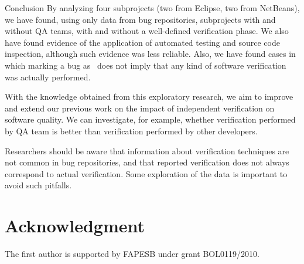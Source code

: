 \begin{section}{Conclusion} \label{sec:conclusion}
	By analyzing four subprojects (two from Eclipse, two from NetBeans), we have found, using only data from bug repositories, subprojects with and without QA teams, with and without a well-defined verification phase. We also have found evidence of the application of automated testing and source code inspection, although such evidence was less reliable. Also, we have found cases in which marking a bug as \VERIFIED\ does not imply that any kind of software verification was actually performed.
			
	With the knowledge obtained from this exploratory research, we aim to improve and extend our previous work on the impact of independent verification on software quality. We can investigate, for example, whether verification performed by QA team is better than verification performed by other developers.
	
	Researchers should be aware that information about verification techniques are not common in bug repositories, and that reported verification does not always correspond to actual verification. Some exploration of the data is important to avoid such pitfalls.
	
	
\end{section}

\section*{Acknowledgment}

The first author is supported by FAPESB under grant BOL0119/2010.

